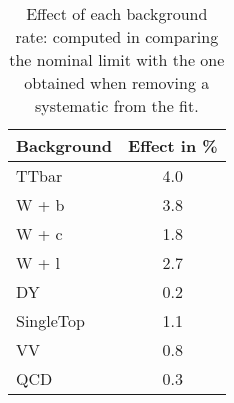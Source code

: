 \documentclass[10pt]{article}
\begin{document}
\begin{table}[!ht]
\begin{center}
\begin{tabular}{|l|c|}
\hline
\hline
\hline
\textbf{Background} & \textbf{Effect in \%} \\
\hline
TTbar            &  4.0 \\
W + b            &  3.8 \\
W + c            &  1.8 \\
W + l            &  2.7 \\
DY               &  0.2 \\
SingleTop        &  1.1 \\
VV               &  0.8 \\
QCD              &  0.3 \\
\hline
\hline

\hline
\hline
\end{tabular}
\caption{Effect of each background rate: computed in comparing the nominal limit with the one obtained when removing a systematic from the fit.}
\label{tab:SFtable}
\end{center}
\end{table} 
\end{document}
